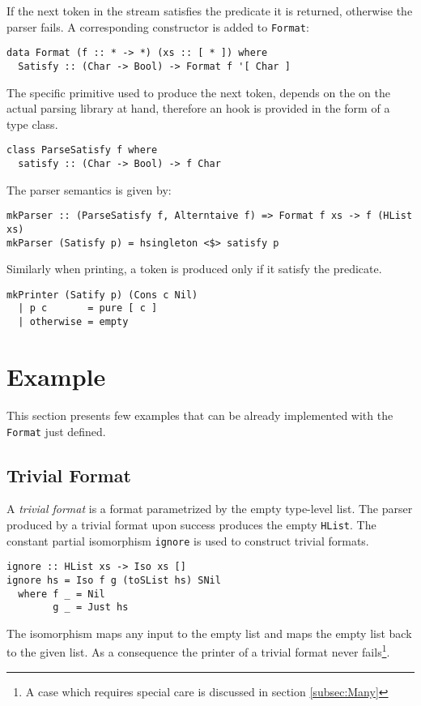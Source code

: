 \documentclass[../Thesis.tex]{subfiles}
\begin{document}
If the next token in the stream satisfies the predicate it is returned, otherwise the parser fails.
A corresponding constructor is added to \texttt{Format}:

\begin{verbatim}
data Format (f :: * -> *) (xs :: [ * ]) where
  Satisfy :: (Char -> Bool) -> Format f '[ Char ]
\end{verbatim}

The specific primitive used to produce the next token, depends on the on the actual parsing library at hand, therefore an hook is provided in the form of a type class.

\begin{verbatim}
class ParseSatisfy f where
  satisfy :: (Char -> Bool) -> f Char
\end{verbatim}

The parser semantics is given by:
\begin{verbatim}
mkParser :: (ParseSatisfy f, Alterntaive f) => Format f xs -> f (HList xs)
mkParser (Satisfy p) = hsingleton <$> satisfy p
\end{verbatim} 

Similarly when printing, a token is produced only if it satisfy the predicate.
\begin{verbatim}
mkPrinter (Satify p) (Cons c Nil) 
  | p c       = pure [ c ]
  | otherwise = empty
\end{verbatim}

\section{Example}
This section presents few examples that can be already implemented with the \texttt{Format} just defined.

\subsection{Trivial Format}
A \emph{trivial format }is a format parametrized by the empty type-level list.
The parser produced by a trivial format upon success produces the empty \texttt{HList}. The constant partial isomorphism \texttt{ignore} is used to construct trivial formats.

\begin{verbatim}
ignore :: HList xs -> Iso xs []
ignore hs = Iso f g (toSList hs) SNil
  where f _ = Nil
        g _ = Just hs
\end{verbatim}
The isomorphism maps any input to the empty list and maps the empty list back to the given list. As a consequence the printer of a trivial format never fails\footnote{A case which requires special care is discussed in section \ref{subsec:Many}}.
\end{document}
